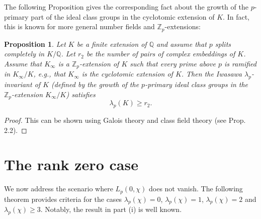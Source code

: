 \documentclass[pdflatex,sn-mathphys-num]{sn-jnl}%
\theoremstyle{plain}
\newtheorem{prop}[thm]{Proposition}
\theoremstyle{definition}
\theoremstyle{remark}
\numberwithin{equation}{section}
\newcommand{\QQ}{\mathbb{Q}}
\newcommand{\Zp}{\mathbb{Z}_p}
\begin{document}
The following Proposition gives the corresponding fact about the growth of the $p$-primary part of the ideal class groups in the cyclotomic extension of $K$. In fact, this is known for more general number fields and $\Zp$-extensions: 

\begin{prop} Let $K$ be a finite extension of $\QQ$ and assume that $p$ splits completely in $K/\QQ$. Let $r_2$ be the number of pairs of complex embeddings of $K$.
Assume that $K_{\infty}$ is a $\Zp$-extension of $K$ such that every prime above $p$ is ramified in $K_{\infty}/K$, e.g., that $K_{\infty}$ is the cyclotomic extension of $K$. Then the Iwasawa $\lambda_p$-invariant of $K$ (defined by the growth of the $p$-primary ideal class groups in the $\Zp$-extension $K_{\infty}/K$) satisfies
$$\lambda_p(K) \geq r_2 .$$ 
\end{prop}
\begin{proof} 
This can be shown using Galois theory and class field theory (see \cite{Gr} Prop. 2.2).
\end{proof}





\section{The rank zero case}\label{Sect4}

We now address the scenario where $L_p(0,\chi)$ does not vanish. The following theorem provides criteria for the cases $\lambda_p(\chi)=0$, $\lambda_p(\chi) = 1$, $\lambda_p(\chi) =2$ and $\lambda_p(\chi) \geq 3$. Notably, the result in part (i) is well known.
\end{document}

